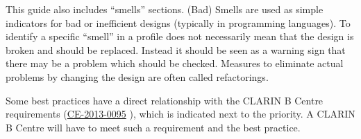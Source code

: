 
This guide also includes ``smells'' sections. (Bad) Smells are used as simple indicators for bad or inefficient designs (typically in programming languages). To identify a specific ``smell'' in a profile does not necessarily mean that the design is broken and should be replaced. Instead it should be seen as a warning sign that there may be a problem which should be checked. Measures to eliminate actual problems by changing the design are often called refactorings. 

Some best practices have a direct relationship with the CLARIN B Centre requirements (\href{http://hdl.handle.net/11372/DOC-78}{CE-2013-0095} \cite{ce20130095}),
which is indicated next to the priority. A CLARIN B Centre will have to meet such a requirement and the best practice.
